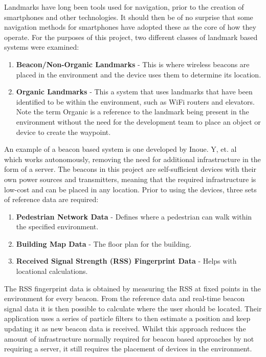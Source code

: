 \documentclass[12pt,a4paper]{report}
\begin{document}
Landmarks have long been tools used for navigation, prior to the creation of smartphones and other technologies. It should then be of no surprise that some navigation methods for smartphones have adopted these as the core of how they operate. For the purposes of this project, two different classes of landmark based systems were examined:

\begin{enumerate}
	\item \textbf{Beacon/Non-Organic Landmarks} - This is where wireless beacons are placed in the environment and the device uses them to determine its location.
	\item \textbf{Organic Landmarks} - This a system that uses landmarks that have been identified to be within the environment, such as WiFi routers and elevators. Note the term Organic is a reference to the landmark being present in the environment without the need for the development team to place an object or device to create the waypoint.
\end{enumerate}

An example of a beacon based system is one developed by Inoue. Y, et. al ~\cite{Inoue2009} which works autonomously, removing the need for additional infrastructure in the form of a server. The beacons in this project are self-sufficient devices with their own power sources and transmitters, meaning that the required infrastructure is low-cost and can be placed in any location. Prior to using the devices, three sets of reference data are required:

\begin{enumerate}
	\item \textbf{Pedestrian Network Data} - Defines where a pedestrian can walk within the specified environment.
	\item \textbf{Building Map Data} - The floor plan for the building.
	\item \textbf{Received Signal Strength (RSS) Fingerprint Data} - Helps with locational calculations.
\end{enumerate}

The RSS fingerprint data is obtained by measuring the RSS at fixed points in the environment for every beacon. From the reference data and real-time beacon signal data it is then possible to calculate where the user should be located. Their application uses a series of particle filters to then estimate a position and keep updating it as new beacon data is received. Whilst this approach reduces the amount of infrastructure normally required for beacon based approaches by not requiring a server, it still requires the placement of devices in the environment.
\end{document}
